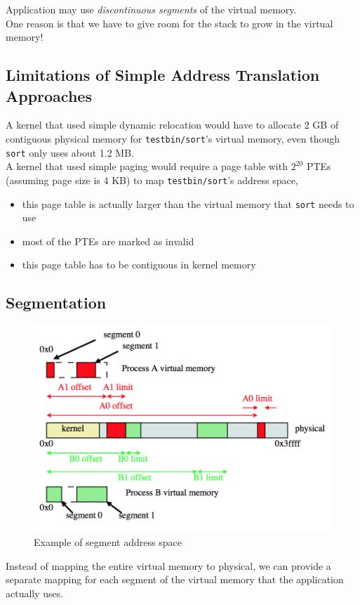 \documentclass[12pt]{article}
\theoremstyle{plain}
\theoremstyle{definition}
\begin{document}
Application may use \emph{discontinuous segments} of the virtual memory. \\
One reason is that we have to give room for the stack to grow in the virtual memory!

\subsection{Limitations of Simple Address Translation Approaches}
A kernel that used simple dynamic relocation would have to allocate 2 GB of contiguous physical memory for \texttt{testbin/sort}'s virtual memory, even though \texttt{sort} only uses about 1.2 MB. \\

A kernel that used simple paging would require a page table with $2^{20}$ PTEs (assuming page size is 4 KB) to map \texttt{testbin/sort}'s address space,
\begin{itemize}
  \item this page table is actually larger than the virtual memory that \texttt{sort} needs to use
  \item most of the PTEs are marked as invalid
  \item this page table has to be contiguous in kernel memory
\end{itemize}

\subsection{Segmentation}
\begin{figure}[H]
  \centering
  \includegraphics[scale=0.65]{pictures/seg_addr_space.png}
  \caption{Example of segment address space}
  \label{fig:seg_addr_space}
\end{figure}
Instead of mapping the entire virtual memory to physical, we can provide a separate mapping for each segment of the virtual memory that the application actually uses. \\
\end{document}
